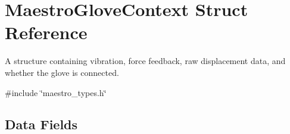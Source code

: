 \hypertarget{struct_maestro_glove_context}{}\section{Maestro\+Glove\+Context Struct Reference}
\label{struct_maestro_glove_context}


A structure containing vibration, force feedback, raw displacement data, and whether the glove is connected.  




{\ttfamily \#include \char`\"{}maestro\+\_\+types.\+h\char`\"{}}

\subsection*{Data Fields}
